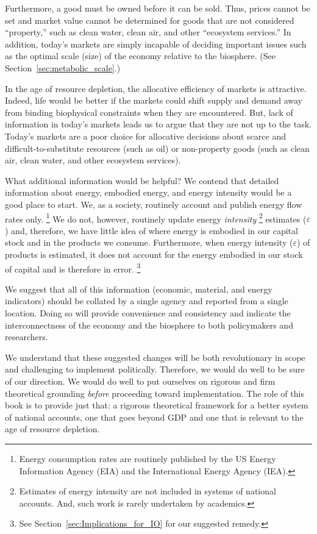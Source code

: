 Furthermore, a good must be owned before 
it can be sold.
Thus, prices cannot be set and market value cannot be determined
for goods that are not considered ``property,'' 
such as clean water, clean air, and other ``ecosystem services.''
In addition, today's markets are simply incapable of deciding
important issues such as the optimal scale (size) of the economy
relative to the biosphere. (See Section~\ref{sec:metabolic_scale}.)

In the age of resource depletion, the allocative efficiency of markets is attractive.
Indeed, life would be better if the markets could shift supply and demand away from
binding biophysical constraints when they are encountered. 
But, lack of information
in today's markets leads us to argue that they are not up to the task. 
Today's markets are a poor choice for allocative decisions 
about scarce and difficult-to-substitute resources (such as oil)
or non-property goods (such as clean air, clean water, and other ecosystem services).

What additional information would be helpful?
We contend that detailed information about energy, embodied energy, and energy intensity
would be a good place to start.
We, as a society, routinely account and publish energy flow rates only.%
	 \footnote{
	 Energy consumption rates are routinely published by the 
	 US Energy Information Agency (EIA) and the 
	 International Energy Agency (IEA).
	 }
We do not, however, routinely update energy \emph{intensity}%
	\footnote{
	Estimates of energy intensity are not included in systems of national accounts.
	And, such work is rarely undertaken by academics.\citep{Bullard1975, EIOLCA2014} 
	}
estimates ($\varepsilon$)
and, therefore, 
we have little idea of where energy is embodied 
in our capital stock and 
in the products we consume.
Furthermore, when energy intensity ($\varepsilon$) of products is estimated, 
it does not account for the energy embodied in our stock of capital
and is therefore in error.%
	\footnote{
	See Section~\ref{sec:Implications_for_IO} for our suggested remedy.
	}
	
We suggest that all of this information 
(economic, material, and energy indicators) 
should be collated by a single agency and
reported from a single location.
Doing so will provide convenience and consistency and
indicate the interconnectness of the economy and the biosphere
to both policymakers and researchers.

We understand that these suggested changes will be both 
revolutionary in scope and
challenging to implement politically.
Therefore, we would do well to be sure of our direction.
We would do well to put ourselves on rigorous and firm theoretical grounding
\emph{before} proceeding toward implementation. 
The role of this book is to provide just that:
a rigorous theoretical framework
for a better system of national accounts,
one that goes beyond GDP and
one that is relevant to the age of resource depletion.

